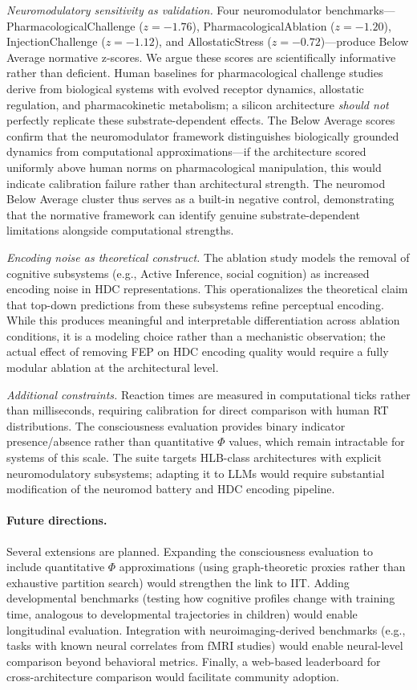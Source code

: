 \documentclass[11pt,letterpaper]{article}
\newcommand{\hlb}{\textsc{HLB}}
\begin{document}
\emph{Neuromodulatory sensitivity as validation.} Four neuromodulator benchmarks---Pharma\-cological\-Challenge ($z {=} {-}1.76$), Pharma\-cological\-Ablation ($z {=} {-}1.20$), Injection\-Challenge ($z {=} {-}1.12$), and Allostatic\-Stress ($z {=} {-}0.72$)---produce Below Average normative z-scores. We argue these scores are scientifically informative rather than deficient. Human baselines for pharmacological challenge studies derive from biological systems with evolved receptor dynamics, allostatic regulation, and pharmacokinetic metabolism; a silicon architecture \emph{should not} perfectly replicate these substrate-dependent effects. The Below Average scores confirm that the neuromodulator framework distinguishes biologically grounded dynamics from computational approximations---if the architecture scored uniformly above human norms on pharmacological manipulation, this would indicate calibration failure rather than architectural strength. The neuromod Below Average cluster thus serves as a built-in negative control, demonstrating that the normative framework can identify genuine substrate-dependent limitations alongside computational strengths.

\emph{Encoding noise as theoretical construct.} The ablation study models the removal of cognitive subsystems (e.g., Active Inference, social cognition) as increased encoding noise in HDC representations. This operationalizes the theoretical claim that top-down predictions from these subsystems refine perceptual encoding. While this produces meaningful and interpretable differentiation across ablation conditions, it is a modeling choice rather than a mechanistic observation; the actual effect of removing FEP on HDC encoding quality would require a fully modular ablation at the architectural level.

\emph{Additional constraints.} Reaction times are measured in computational ticks rather than milliseconds, requiring calibration for direct comparison with human RT distributions. The consciousness evaluation provides binary indicator presence/absence rather than quantitative $\Phi$ values, which remain intractable for systems of this scale. The suite targets \hlb{}-class architectures with explicit neuromodulatory subsystems; adapting it to LLMs would require substantial modification of the neuromod battery and HDC encoding pipeline.

\paragraph{Future directions.} Several extensions are planned. Expanding the consciousness evaluation to include quantitative $\Phi$ approximations (using graph-theoretic proxies rather than exhaustive partition search) would strengthen the link to IIT. Adding developmental benchmarks (testing how cognitive profiles change with training time, analogous to developmental trajectories in children) would enable longitudinal evaluation. Integration with neuroimaging-derived benchmarks (e.g., tasks with known neural correlates from fMRI studies) would enable neural-level comparison beyond behavioral metrics. Finally, a web-based leaderboard for cross-architecture comparison would facilitate community adoption.
\end{document}
